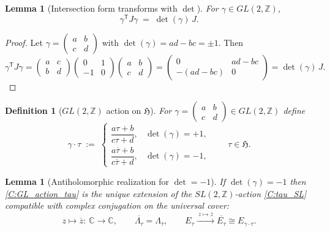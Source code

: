 \documentclass[11pt]{article}
\newtheorem{lemma}[theorem]{Lemma}
\newtheorem{definition}[theorem]{Definition}
\theoremstyle{remark}
\begin{document}
\begin{lemma}[Intersection form transforms with $\det$]
\label{C:det_J}
For $\gamma\in GL(2,\mathbb Z)$,
\begin{equation}
\gamma^{\mathsf T}J\gamma \;=\; \det(\gamma)\,J.
\label{C:J_det}
\end{equation}
\end{lemma}

\begin{proof}
Let $\gamma=\begin{pmatrix}a&b\\ c&d\end{pmatrix}$ with $\det(\gamma)=ad-bc=\pm 1$. Then
\begin{equation}
\gamma^{\mathsf T}J\gamma
=
\begin{pmatrix}a&c\\ b&d\end{pmatrix}
\begin{pmatrix}0&1\\-1&0\end{pmatrix}
\begin{pmatrix}a&b\\ c&d\end{pmatrix}
=
\begin{pmatrix}0&ad-bc\\ -(ad-bc)&0\end{pmatrix}
=
\det(\gamma)\,J.
\end{equation}
\end{proof}

\begin{definition}[$GL(2,\mathbb Z)$ action on $\mathfrak H$]
For $\gamma=\begin{pmatrix}a&b\\ c&d\end{pmatrix}\in GL(2,\mathbb Z)$ define
\begin{equation}
\gamma\cdot \tau
\;:=\;
\begin{cases}
\dfrac{a\tau+b}{c\tau+d}, & \det(\gamma)=+1,\\[2.2ex]
\dfrac{a\overline{\tau}+b}{c\overline{\tau}+d}, & \det(\gamma)=-1,
\end{cases}
\qquad \tau\in\mathfrak H.
\label{C:GL_action_tau}
\end{equation}
\end{definition}

\begin{lemma}[Antiholomorphic realization for $\det=-1$]
\label{C:detminus_antiholo}
If $\det(\gamma)=-1$ then \eqref{C:GL_action_tau} is the unique extension of the $SL(2,\mathbb Z)$-action \eqref{C:tau_SL} compatible with complex conjugation on the universal cover:
\begin{equation}
z\mapsto \overline{z}:\ \mathbb C\to\mathbb C,
\qquad
\overline{\Lambda_{\tau}}=\Lambda_{\overline{\tau}},
\qquad
E_{\tau}\xrightarrow{\ z\mapsto\overline{z}\ }\overline{E_{\tau}} \cong E_{\gamma\cdot\tau}.
\label{C:conj_lattice}
\end{equation}
\end{lemma}
\end{document}
